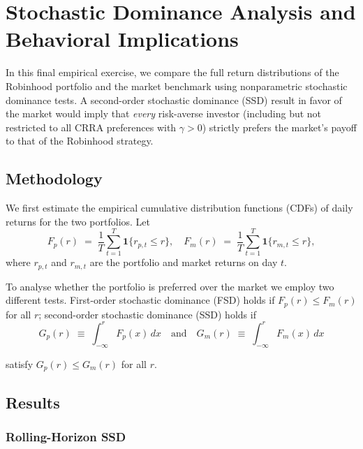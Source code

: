 \section{Stochastic Dominance Analysis and Behavioral Implications}

In this final empirical exercise, we compare the full return distributions of the Robinhood portfolio and the market benchmark using nonparametric stochastic dominance tests.  
A second-order stochastic dominance (SSD) result in favor of the market would imply that \emph{every} risk-averse investor 
(including but not restricted to all CRRA preferences with $\gamma>0$) strictly prefers the market's payoff to that of the Robinhood strategy.

\subsection{Methodology}
We first estimate the empirical cumulative distribution functions (CDFs) of daily returns for the two portfolios.  Let
\begin{equation}    
    F_{p}(r) \;=\; \frac{1}{T}\sum_{t=1}^{T}\mathbf{1}\{r_{p,t}\le r\},
    \quad
    F_{m}(r) \;=\; \frac{1}{T}\sum_{t=1}^{T}\mathbf{1}\{r_{m,t}\le r\},
\end{equation}
where $r_{p,t}$ and $r_{m,t}$ are the portfolio and market returns on day $t$.  

To analyse whether the portfolio is preferred over the market we employ two different tests.
First-order stochastic dominance (FSD) holds if $F_{p}(r)\le F_{m}(r)$ for all $r$; 
second-order stochastic dominance (SSD) holds if
\begin{equation}    
    G_{p}(r) \;\equiv\;\int_{-\infty}^{r}F_{p}(x)\,dx
    \quad\text{and}\quad
    G_{m}(r)\;\equiv\;\int_{-\infty}^{r}F_{m}(x)\,dx
\end{equation}

satisfy $G_{p}(r)\le G_{m}(r)$ for all $r$.


\subsection{Results}
\subsubsection{Rolling-Horizon SSD}
